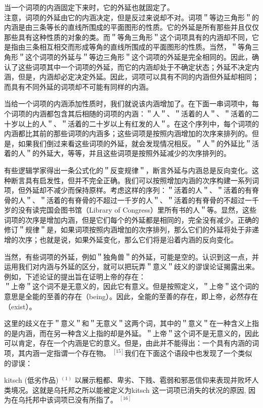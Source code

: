 当一个词项的内涵固定下来时，它的外延也就固定了。\\
注意，词项的外延由它的内涵决定，但是反过来说却不对。词项＂等边三角形＂的内涵是由三条等长的直线所围成的平面图形的性质。它的外延是所有那些并且仅仅那些具有这种性质的对象的类。而＂等角三角形＂这个词项具有的内涵却不同，它是指由三条相互相交而形成等角的直线所围成的平面图形的性质。当然，＂等角三角形＂这个词项的外延与＂等边三角形＂这个词项的外延是完全相同的。因此，确认了这些词项其中一个词项的外延，而它的内涵却处于不确定状态；外延不决定内涵，但是，内涵却必定决定外延。因此，词项可以具有不同的内涵但外延却相同；而具有不同外延的词项却不可能有同样的内涵。

当给一个词项的内涵添加性质时，我们就说该内涵增加了。在下面一串词项中，每个词项的内涵都包含其后相随的词项的内涵：＂人＂、＂活着的人＂、＂活着的二十岁以上的人＂、＂活着的二十岁以上有红发的人＂。在这个序列中，每个词项的内涵都比其前的那些词项的内涵多；这些词项是按照内涵增加的次序来排列的。但是，如果我们倒过来看这些词项的外延，就会发现情况相反。＂人＂的外延比＂活着的人＂的外延大，等等，并且这些词项是按照外延减少的次序排列的。

有些逻辑学家得出一条公式化的＂反变规律＂，断言外延与内涵总是反向变化。这种断言具有启发性，但并不完全正确。我们可以按照增加内涵的次序构建一系列词项，但外延却不减少而保持原样。考虑这样的序列：＂活着的人＂、＂活着的有脊骨的人＂、＂活着的有脊骨的不超过一千岁的人＂、＂活着的有脊骨的不超过一千岁的没有读完国会图书馆（Library of Congress）里所有书的人＂等。显然，这些词项的次序是增加内涵，但是它们每个的外延都是相同的，完全没有减少。正确的修订＂规律＂是，如果词项按照内涵增加的次序排列，那么它们的外延将处于非递增的次序；也就是说，如果外延变化，那么它们将是沿着内涵的反向变化。

当然，有些词项的外延，例如＂独角兽＂的外延，可能是空的。认识到这一点，并运用我们对内涵与外延的区分，就可以把玩弄＂意义＂歧义的谬误论证揭露出来。例如，下述论证的提出旨在证明上帝的存在：\\
＂上帝＂这个词不是无意义的，因此它有意义。但是按照定义，＂上帝＂这个词的意思是全能的至善的存在（being）。因此，全能的至善的存在，即上帝，必然存在（exist）。

这里的歧义在于＂意义＂和＂无意义＂这两个词，其中的＂意义＂在一种含义上指的是内涵，而在另一种含义上指的却是外延。＂上帝＂这个词不是无意义的，因此可以肯定，存在一个内涵是它的意义。但是，由此并不能得出：一个具有内涵的词项，其内涵一定指谓一个存在物。 ${ }^{[15]}$我们在下面这个语段中也发现了一个类似的谬误：

\begin{displayquote}
kitsch (低劣作品) ${ }^{(1)}$ 以展示粗都、卑劣、下贱、雹弱和邪恶信仰来表现并败坏人类境况。这就是乌托邦之所以能被定义为kitsch 这一词项已消失的状况的原因, 因为在乌托邦中该词项已没有所指了。 ${ }^{[16]}$
\end{displayquote}

